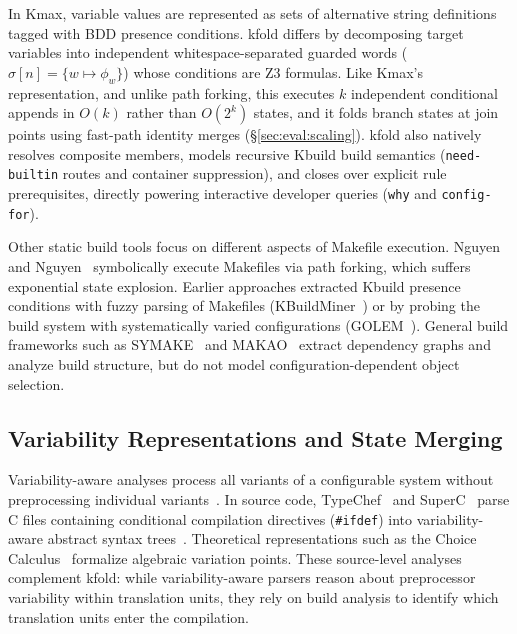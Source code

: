 \documentclass[acmsmall]{acmart}
\newcommand{\tool}{\textsf{kfold}\xspace}
\newcommand{\kmax}{\textsf{Kmax}\xspace}
\begin{document}
In \kmax, variable values are represented as sets of alternative string definitions tagged with BDD presence conditions.
\tool differs by decomposing target variables into independent whitespace-separated guarded words ($\sigma[n] = \{w \mapsto \phi_w\}$) whose conditions are Z3 formulas.
Like \kmax's representation, and unlike path forking, this executes $k$ independent conditional appends in $O(k)$ rather than $O(2^k)$ states, and it folds branch states at join points using fast-path identity merges (\S\ref{sec:eval:scaling}).
\tool also natively resolves composite members, models recursive Kbuild build semantics (\texttt{need-builtin} routes and container suppression), and closes over explicit rule prerequisites, directly powering interactive developer queries (\texttt{why} and \texttt{config-for}).

Other static build tools focus on different aspects of Makefile execution.
Nguyen and Nguyen~\cite{nguyen2020using} symbolically execute Makefiles via path forking, which suffers exponential state explosion.
Earlier approaches extracted Kbuild presence conditions with fuzzy parsing of Makefiles (KBuildMiner~\cite{berger2010feature}) or by probing the build system with systematically varied configurations (GOLEM~\cite{dietrich2012variability}).
General build frameworks such as \textsc{SYMAKE}~\cite{tamrawi2012symake} and \textsc{MAKAO}~\cite{adams2007makao} extract dependency graphs and analyze build structure, but do not model configuration-dependent object selection.

\subsection{Variability Representations and State Merging}

Variability-aware analyses process all variants of a configurable system without preprocessing individual variants~\cite{apel2013feature,thum2014potential,liebig2010analysis}.
In source code, TypeChef~\cite{kenner2010typechef} and SuperC~\cite{gazzillo2012superc} parse C files containing conditional compilation directives (\texttt{\#ifdef}) into variability-aware abstract syntax trees~\cite{kastner2011variability,liebig2011variability}.
Theoretical representations such as the Choice Calculus~\cite{erwig2011choice} formalize algebraic variation points.
These source-level analyses complement \tool: while variability-aware parsers reason about preprocessor variability within translation units, they rely on build analysis to identify which translation units enter the compilation.
\end{document}
